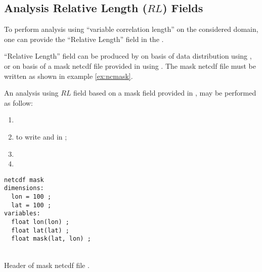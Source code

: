 \subsection{Analysis Relative Length ($RL$) Fields }

To perform analysis using ``variable correlation length'' on the considered domain, one can provide the ``Relative Length'' field in the .

``Relative Length'' field can be produced by \diva on basis of data distribution using , or on basis of a mask netcdf file  provided in   using . The mask netcdf file must be written as shown in example \ref{ex:ncmask}. 

An analysis using  $RL$ field based on a mask field provided in  , may be performed as follow:

\begin{enumerate}
\item {}
\item {} \qquad to write  and  in ;
\item {}
\item {}
\end{enumerate}


\begin{exfile}[htpb]
\begin{footnotesize}
\texttt{netcdf mask  \\
dimensions:\\
\mbox{      } lon = 100 ;\\
\mbox{      } lat = 100 ;\\
variables:\\
\mbox{      } float lon(lon) ;\\
\mbox{      } float lat(lat) ;\\
\mbox{      } float mask(lat, lon) ;\\
 \\
}
\end{footnotesize}
\caption{Header of mask netcdf file . \label{ex:ncmask}}
\end{exfile}

